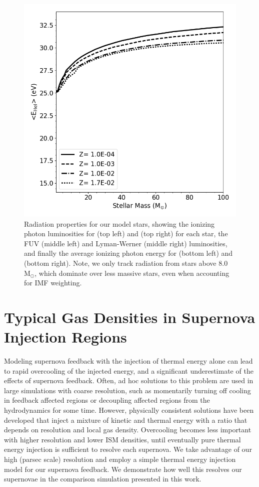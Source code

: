 \documentclass[twocolumn]{aastex61}
\newcommand{\msun}{M$_{\odot}$}
\begin{document}
\begin{figure}
\includegraphics[width=0.4\linewidth]{E1}
\caption{Radiation properties for our model stars, showing the ionizing photon luminosities for  (top left) and  (top right) for each star, the FUV (middle left) and Lyman-Werner (middle right) luminosities, and finally the average ionizing photon energy for  (bottom left) and  (bottom right). Note, we only track radiation from stars above 8.0 \msun, which dominate over less massive stars, even when accounting for IMF weighting.}
\label{fig:stellar radiation properties}
\end{figure}

\section{Typical Gas Densities in Supernova Injection Regions}
\label{appendix:supernova}

Modeling supernova feedback with the injection of thermal energy alone can lead to rapid overcooling of the injected energy, and a significant underestimate of the effects of supernova feedback. Often, ad hoc solutions to this problem are used in large simulations with coarse resolution, such as momentarily turning off cooling in feedback affected regions or decoupling affected regions from the hydrodynamics for some time. However, physically consistent solutions have been developed \citep[e.g][]{Simpson2016} that inject a mixture of kinetic and thermal energy with a ratio that depends on resolution and local gas density. 
   Overcooling becomes less important 
with higher resolution and lower ISM densities, until eventually pure thermal energy injection is sufficient to resolve each supernova. We take advantage of our high (parsec scale) resolution and employ a simple thermal energy injection model for our supernova feedback. We demonstrate how well this resolves our supernovae in the comparison simulation presented in this work.
\end{document}
